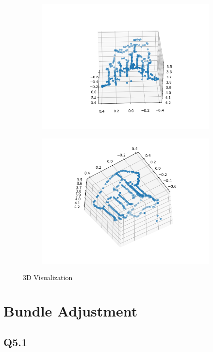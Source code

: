 \documentclass{article} %
\begin{document}
\begin{figure}[h]
\begin{subfigure}[b]{0.5\textwidth}
            \includegraphics[width=\textwidth]{q4,2_3.png}
        \end{subfigure}
        \begin{subfigure}[b]{0.5\textwidth}
            \includegraphics[width=\textwidth]{q4,2_4.png}
        \end{subfigure}
        \caption{3D Visualization}
    \end{figure}

    \section{Bundle Adjustment}
    \subsection*{Q5.1}
\end{document}
